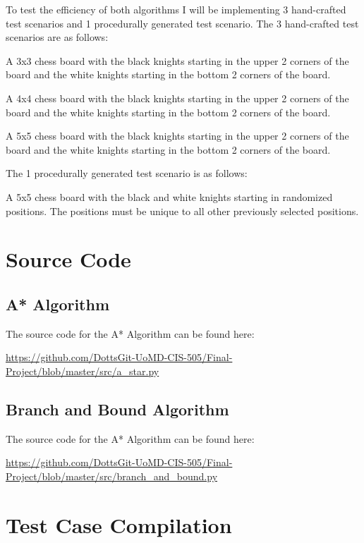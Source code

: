 \documentclass[12pt, letterpaper, final, onecolumn, titlepage] {article}
\begin{document}
\noindent To test the efficiency of both algorithms I will be implementing 3 hand-crafted test scenarios and 1 procedurally generated test scenario.  The 3 hand-crafted test scenarios are as follows:

\noindent A 3x3 chess board with the black knights starting in the upper 2 corners of the board and the white knights starting in the bottom 2 corners of the board.

\noindent A 4x4 chess board with the black knights starting in the upper 2 corners of the board and the white knights starting in the bottom 2 corners of the board.

\noindent A 5x5 chess board with the black knights starting in the upper 2 corners of the board and the white knights starting in the bottom 2 corners of the board.

\noindent The 1 procedurally generated test scenario is as follows:

\noindent A 5x5 chess board with the black and white knights starting in randomized positions.  The positions must be unique to all other previously selected positions.

\newpage

\section{Source Code}
\subsection{A* Algorithm}
\noindent The source code for the A* Algorithm can be found here: 

\url{https://github.com/DottsGit-UoMD-CIS-505/Final-Project/blob/master/src/a_star.py}

\subsection{Branch and Bound Algorithm}
\noindent The source code for the A* Algorithm can be found here: 

\url{https://github.com/DottsGit-UoMD-CIS-505/Final-Project/blob/master/src/branch_and_bound.py}

\newpage

\section{Test Case Compilation}
\end{document}

